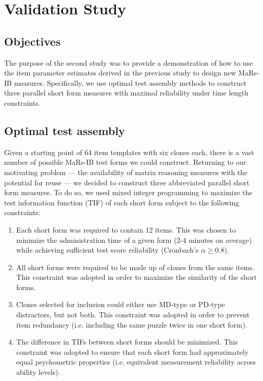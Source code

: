 \documentclass[a4paper,man,natbib]{apa6}
\begin{document}
\section{Validation Study}

\subsection{Objectives}

The purpose of the second study was to provide a demonstration of how to use the item parameter estimates derived in the previous study to design new MaRs-IB measures. Specifically, we use optimal test assembly methods to construct three parallel short form measures with maximal reliability under time length constraints. 

\subsection{Optimal test assembly}

Given a starting point of 64 item templates with six clones each, there is a vast number of possible MaRs-IB test forms we could construct. Returning to our motivating problem --- the availability of matrix reasoning measures with the potential for reuse --- we decided to construct three abbreviated parallel short form measures. To do so, we used mixed integer programming \citep{der2005wj} to maximize the test information function (TIF) of each short form subject to the following constraints:

\begin{enumerate}

    \item Each short form was required to contain 12 items. This was chosen to minimize the administration time of a given form (2-4 minutes on average) while achieving sufficient test score reliability (Cronbach's $\alpha \geq 0.8$).
    
    \item All short forms were required to be made up of clones from the same items. This constraint was adopted in order to maximize the similarity of the short forms.
    
    \item Clones selected for inclusion could either use MD-type or PD-type distractors, but not both. This constraint was adopted in order to prevent item redundancy (i.e. including the same puzzle twice in one short form).
    
    \item The difference in TIFs between short forms should be minimized. This constraint was adopted to ensure that each short form had approximately equal psychometric properties (i.e. equivalent measurement reliability across ability levels). 
    
\end{enumerate}
\end{document}
